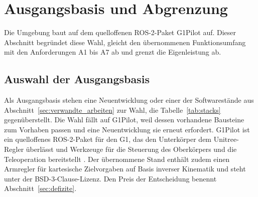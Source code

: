 
\section{Ausgangsbasis und Abgrenzung}
\label{sec:ausgangsbasis}
Die Umgebung baut auf dem quelloffenen ROS-2-Paket G1Pilot auf.
Dieser Abschnitt begründet diese Wahl, gleicht den übernommenen Funktionsumfang mit den Anforderungen A1 bis A7 ab und grenzt die Eigenleistung ab.

\subsection{Auswahl der Ausgangsbasis}
\label{sec:auswahl_basis}
Als Ausgangsbasis stehen eine Neuentwicklung oder einer der Softwarestände aus Abschnitt~\ref{sec:verwandte_arbeiten} zur Wahl, die Tabelle~\ref{tab:stacks} gegenüberstellt.
Die Wahl fällt auf G1Pilot, weil dessen vorhandene Bausteine zum Vorhaben passen und eine Neuentwicklung sie erneut erfordert.
G1Pilot ist ein quelloffenes ROS-2-Paket für den G1, das den Unterkörper dem Unitree-Regler überlässt und Werkzeuge für die Steuerung des Oberkörpers und die Teleoperation bereitstellt \cite{HucebotG1Pilot}.
Der übernommene Stand enthält zudem einen Armregler für kartesische Zielvorgaben auf Basis inverser Kinematik und steht unter der BSD-3-Clause-Lizenz.
Den Preis der Entscheidung benennt Abschnitt~\ref{sec:defizite}.


